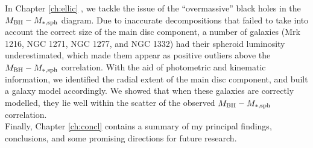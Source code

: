 In Chapter \ref{ch:ellic} \citep{ellicular}, 
we tackle the issue of the ``overmassive'' black holes 
in the $M_{\rm BH} - M_{\rm *,sph}$ diagram. 
Due to inaccurate decompositions that failed to take into account the correct size of the main disc component, 
a number of galaxies (Mrk 1216, NGC 1271, NGC 1277, and NGC 1332) had their spheroid luminosity underestimated, 
which made them appear as positive outliers above the $M_{\rm BH} - M_{\rm *,sph}$ correlation. 
With the aid of photometric and kinematic information, 
we identified the radial extent of the main disc component, 
and built a galaxy model accordingly. 
We showed that when these galaxies are correctly modelled, 
they lie well within the scatter of the observed $M_{\rm BH} - M_{\rm *,sph}$ correlation. \\

Finally, Chapter \ref{ch:concl} contains a summary of my principal findings, conclusions, 
and some promising directions for future research. 
